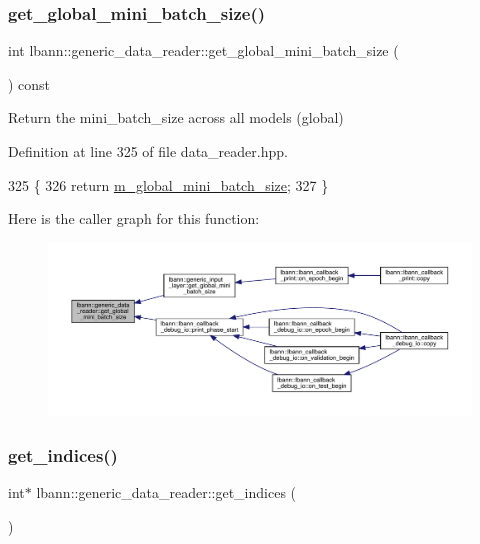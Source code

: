 \subsubsection{\texorpdfstring{get\+\_\+global\+\_\+mini\+\_\+batch\+\_\+size()}{get\_global\_mini\_batch\_size()}}
{\footnotesize\ttfamily int lbann\+::generic\+\_\+data\+\_\+reader\+::get\+\_\+global\+\_\+mini\+\_\+batch\+\_\+size (\begin{DoxyParamCaption}{ }\end{DoxyParamCaption}) const\hspace{0.3cm}{\ttfamily [inline]}}



Return the mini\+\_\+batch\+\_\+size across all models (global) 



Definition at line 325 of file data\+\_\+reader.\+hpp.


\begin{DoxyCode}
325                                          \{
326     \textcolor{keywordflow}{return} \hyperlink{classlbann_1_1generic__data__reader_a7cd8fa7b1db9ea3d154a411f36992476}{m\_global\_mini\_batch\_size};
327   \}
\end{DoxyCode}
Here is the caller graph for this function\+:\nopagebreak
\begin{figure}[H]
\begin{center}
\leavevmode
\includegraphics[width=350pt]{classlbann_1_1generic__data__reader_aaa4110d53f59a127326e63ca4110b56b_icgraph}
\end{center}
\end{figure}
\mbox{\label{classlbann_1_1generic__data__reader_ab5c6c70ea1ecf8f7e2ebe2c486e50134}} 
\subsubsection{\texorpdfstring{get\+\_\+indices()}{get\_indices()}}
{\footnotesize\ttfamily int$\ast$ lbann\+::generic\+\_\+data\+\_\+reader\+::get\+\_\+indices (\begin{DoxyParamCaption}{ }\end{DoxyParamCaption})\hspace{0.3cm}{\ttfamily [inline]}}



